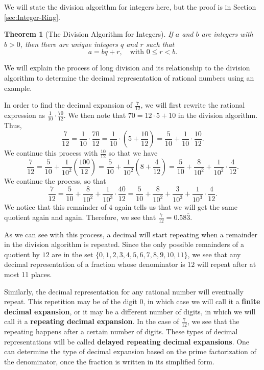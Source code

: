 \documentclass[
]{book}
\newtheorem{theorem}{Theorem}[chapter]
\theoremstyle{definition}
\theoremstyle{definition}
\theoremstyle{definition}
\theoremstyle{remark}
\begin{document}
We will state the division algorithm for integers here, but the proof is in Section \ref{sec:Integer-Ring}.

\begin{theorem}[The Division Algorithm for Integers]
\protect\hypertarget{thm:unnamed-chunk-97}{}{\label{thm:unnamed-chunk-97} {} }If \(a\) and \(b\) are integers with \(b>0\), then there are unique integers \(q\) and \(r\) such that \[a=bq+r, \quad \mbox{with } 0\leq r <b.\]
\end{theorem}

We will explain the process of long division and its relationship to the division algorithm to determine the decimal representation of rational numbers using an example.

In order to find the decimal expansion of \(\frac{7}{12}\), we will first rewrite the rational expression as \(\frac{1}{10} \cdot \frac{70}{12}\). We then note that \(70=12\cdot 5 + 10\) in the division algorithm. Thus,
\[\frac{7}{12} = \frac{1}{10} \cdot \frac{70}{12} = \frac{1}{10} \cdot \left( 5 + \frac{10}{12}\right)= \frac{5}{10} + \frac{1}{10} \cdot \frac{10}{12}.\] We continue this process with \(\frac{10}{12}\) so that we have \[\frac{7}{12}= \frac{5}{10} + \frac{1}{10^2} \left(\frac{100}{12}\right) = \frac{5}{10} + \frac{1}{10^2} \left(8 + \frac{4}{12}\right)= \frac{5}{10} + \frac{8}{10^2} + \frac{1}{10^2} \cdot \frac{4}{12}.\] We continue the process, so that \[\frac{7}{12} = \frac{5}{10} + \frac{8}{10^2} + \frac{1}{10^3} \cdot \frac{40}{12} = \frac{5}{10} + \frac{8}{10^2} + \frac{3}{10^3} + \frac{1}{10^3} \cdot \frac{4}{12}.\] We notice that this remainder of \(4\) again tells us that we will get the same quotient again and again. Therefore, we see that
\(\frac{7}{12} = 0.58\overline{3}\).

As we can see with this process, a decimal will start repeating when a remainder in the division algorithm is repeated. Since the only possible remainders of a quotient by \(12\) are in the set \(\{0,1,2,3,4,5,6,7,8,9,10,11\}\), we see that any decimal representation of a fraction whose denominator is \(12\) will repeat after at most 11 places.

Similarly, the decimal representation for any rational number will eventually repeat. This repetition may be of the digit \(0\), in which case we will call it a \textbf{finite decimal expansion}, or it may be a different number of digits, in which we will call it a \textbf{repeating decimal expansion}. In the case of \(\frac{7}{12}\), we see that the repeating happens after a certain number of digits. These types of decimal representations will be called \textbf{delayed repeating decimal expansions}. One can determine the type of decimal expansion based on the prime factorization of the denominator, once the fraction is written in its simplified form.
\end{document}
